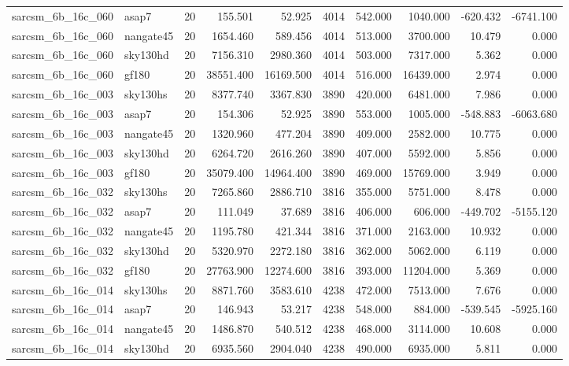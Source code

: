 \documentclass{article}
\begin{document}
\begin{longtable}{llrrrrrrrr}
sarcsm\_6b\_16c\_060 & asap7 & 20 & 155.501 & 52.925 & 4014 & 542.000 & 1040.000 & -620.432 & -6741.100 \\
sarcsm\_6b\_16c\_060 & nangate45 & 20 & 1654.460 & 589.456 & 4014 & 513.000 & 3700.000 & 10.479 & 0.000 \\
sarcsm\_6b\_16c\_060 & sky130hd & 20 & 7156.310 & 2980.360 & 4014 & 503.000 & 7317.000 & 5.362 & 0.000 \\
sarcsm\_6b\_16c\_060 & gf180 & 20 & 38551.400 & 16169.500 & 4014 & 516.000 & 16439.000 & 2.974 & 0.000 \\
sarcsm\_6b\_16c\_003 & sky130hs & 20 & 8377.740 & 3367.830 & 3890 & 420.000 & 6481.000 & 7.986 & 0.000 \\
sarcsm\_6b\_16c\_003 & asap7 & 20 & 154.306 & 52.925 & 3890 & 553.000 & 1005.000 & -548.883 & -6063.680 \\
sarcsm\_6b\_16c\_003 & nangate45 & 20 & 1320.960 & 477.204 & 3890 & 409.000 & 2582.000 & 10.775 & 0.000 \\
sarcsm\_6b\_16c\_003 & sky130hd & 20 & 6264.720 & 2616.260 & 3890 & 407.000 & 5592.000 & 5.856 & 0.000 \\
sarcsm\_6b\_16c\_003 & gf180 & 20 & 35079.400 & 14964.400 & 3890 & 469.000 & 15769.000 & 3.949 & 0.000 \\
sarcsm\_6b\_16c\_032 & sky130hs & 20 & 7265.860 & 2886.710 & 3816 & 355.000 & 5751.000 & 8.478 & 0.000 \\
sarcsm\_6b\_16c\_032 & asap7 & 20 & 111.049 & 37.689 & 3816 & 406.000 & 606.000 & -449.702 & -5155.120 \\
sarcsm\_6b\_16c\_032 & nangate45 & 20 & 1195.780 & 421.344 & 3816 & 371.000 & 2163.000 & 10.932 & 0.000 \\
sarcsm\_6b\_16c\_032 & sky130hd & 20 & 5320.970 & 2272.180 & 3816 & 362.000 & 5062.000 & 6.119 & 0.000 \\
sarcsm\_6b\_16c\_032 & gf180 & 20 & 27763.900 & 12274.600 & 3816 & 393.000 & 11204.000 & 5.369 & 0.000 \\
sarcsm\_6b\_16c\_014 & sky130hs & 20 & 8871.760 & 3583.610 & 4238 & 472.000 & 7513.000 & 7.676 & 0.000 \\
sarcsm\_6b\_16c\_014 & asap7 & 20 & 146.943 & 53.217 & 4238 & 548.000 & 884.000 & -539.545 & -5925.160 \\
sarcsm\_6b\_16c\_014 & nangate45 & 20 & 1486.870 & 540.512 & 4238 & 468.000 & 3114.000 & 10.608 & 0.000 \\
sarcsm\_6b\_16c\_014 & sky130hd & 20 & 6935.560 & 2904.040 & 4238 & 490.000 & 6935.000 & 5.811 & 0.000 \\

\end{longtable}
\end{document}
